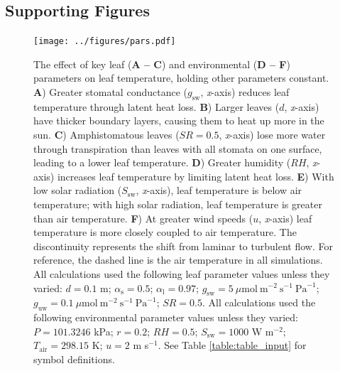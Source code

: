 \documentclass[11pt, oneside]{article}
\begin{document}
\clearpage


\subsection*{Supporting Figures}

\begin{landscape}

\begin{figure}[ht]
\centerline{\texttt{[image: ../figures/pars.pdf]}}
\end{figure}

\end{landscape}

\begin{figure}[t!]
\caption{The effect of key leaf (\textbf{A -- C}) and environmental (\textbf{D -- F}) parameters on leaf temperature, holding other parameters constant. \textbf{A}) Greater stomatal conductance ($g_\mathrm{sw}$, \textit{x}-axis) reduces leaf temperature through latent heat loss. \textbf{B}) Larger leaves ($d$, \textit{x}-axis) have thicker boundary layers, causing them to heat up more in the sun. \textbf{C}) Amphistomatous leaves ($\mathit{SR} = 0.5$, \textit{x}-axis) lose more water through transpiration than leaves with all stomata on one surface, leading to a lower leaf temperature. \textbf{D}) Greater humidity ($\mathit{RH}$, \textit{x}-axis) increases leaf temperature by limiting latent heat loss. \textbf{E}) With low solar radiation ($S_\mathrm{sw}$, \textit{x}-axis), leaf temperature is below air temperature; with high solar radiation, leaf temperature is greater than air temperature. \textbf{F}) At greater wind speeds ($u$, \textit{x}-axis) leaf temperature is more closely coupled to air temperature. The discontinuity represents the shift from laminar to turbulent flow. For reference, the dashed line is the air temperature in all simulations. All calculations used the following leaf parameter values unless they varied: $d = 0.1$ m; $\alpha_\mathrm{s} = 0.5$; $\alpha_\mathrm{l} = 0.97$; $g_\mathrm{sw} = 5~\mu \textrm{mol}~\textrm{m} ^ {-2}~\textrm{s} ^ {-1}~\textrm{Pa} ^ {-1}$; $g_\mathrm{uw} = 0.1~\mu \textrm{mol}~\textrm{m} ^ {-2}~\textrm{s} ^ {-1}~\textrm{Pa} ^ {-1}$; $\mathit{SR} = 0.5$. All calculations used the following environmental parameter values unless they varied: $P = 101.3246$ kPa; $r = 0.2$; $\mathit{RH} = 0.5$; $S_\mathrm{sw} = 1000$ W m$^{-2}$; $T_\mathrm{air} = 298.15$ K; $u = 2$ m s$^{-1}$. See Table \ref{table:table_input} for symbol definitions.}
\label{fig:pars}
\end{figure}
\end{document}
